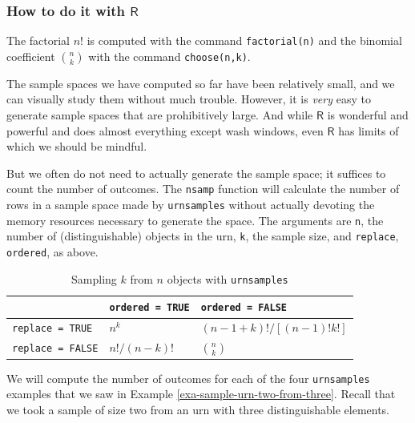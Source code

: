 \documentclass[captions=tableheading]{scrbook}
\begin{document}
\subsubsection{How to do it with \(\mathsf{R}\)}
\label{sec-4-5-2-1}


The factorial \(n!\) is computed with the command \texttt{factorial(n)} and the binomial coefficient \({n \choose k}\) with the command \texttt{choose(n,k)}.

The sample spaces we have computed so far have been relatively small, and we can visually study them without much trouble. However, it is \emph{very} easy to generate sample spaces that are prohibitively large. And while \(\mathsf{R}\) is wonderful and powerful and does almost everything except wash windows, even \(\mathsf{R}\) has limits of which we should be mindful.

But we often do not need to actually generate the sample space; it suffices to count the number of outcomes. The \texttt{nsamp} function will calculate the number of rows in a sample space made by \texttt{urnsamples} without actually devoting the memory resources necessary to generate the space. The arguments are \texttt{n}, the number of (distinguishable) objects in the urn, \texttt{k}, the sample size, and \texttt{replace}, \texttt{ordered}, as above.


\begin{table}[htb]
\caption{Sampling \(k\) from \(n\) objects with \texttt{urnsamples}} \label{tab-Sampling-k-from-n}
\begin{center}
\begin{tabular}{lll}
                           &  \texttt{ordered = TRUE}  &  \texttt{ordered = FALSE}   \\
\hline
 \texttt{replace = TRUE}   &  \(n^{k}\)                &  \((n-1+k)! / [(n-1)!k!]\)  \\
 \texttt{replace = FALSE}  &  \( n! / (n-k)! \)        &  \( {n \choose k} \)        \\
\hline
\end{tabular}
\end{center}
\end{table}



\begin{example}
We will compute the number of outcomes for each of the four \texttt{urnsamples} examples that we saw in Example \ref{exa-sample-urn-two-from-three}. Recall that we took a sample of size two from an urn with three distinguishable elements.
\end{example}
\end{document}
